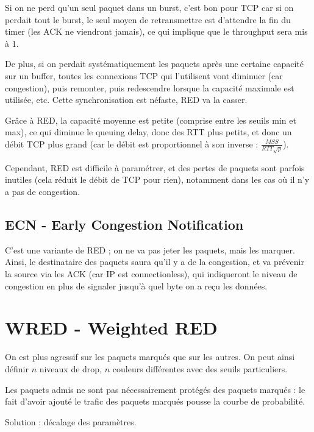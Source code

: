 			Si on ne perd qu'un seul paquet dans un burst, c'est bon pour TCP car si on perdait tout le burst, le seul moyen de retransmettre est d'attendre la fin du timer (les ACK ne viendront jamais), ce qui implique que le throughput sera mis à 1.
			
			De plus, si on perdait systématiquement les paquets après une certaine capacité sur un buffer, toutes les connexions TCP qui l'utilisent vont diminuer (car congestion), puis remonter, puis redescendre lorsque la capacité maximale est utilisée, etc. Cette synchronisation est néfaste, RED va la casser.
			
			Grâce à RED, la capacité moyenne est petite (comprise entre les seuils min et max), ce qui diminue le queuing delay, donc des RTT plus petits, et donc un débit TCP plus grand (car le débit est proportionnel à son inverse : $\frac{MSS}{RTT \sqrt{p}}$).
			
			Cependant, RED est difficile à paramétrer, et des pertes de paquets sont parfois inutiles (cela réduit le débit de TCP pour rien), notamment dans les cas où il n'y a pas de congestion.
			
			
			\subsection{ECN - Early Congestion Notification}
			
			C'est une variante de RED ; on ne va pas jeter les paquets, mais les marquer. Ainsi, le destinataire des paquets saura qu'il y a de la congestion, et va prévenir la source via les ACK (car IP est connectionless), qui indiqueront le niveau de congestion en plus de signaler jusqu'à quel byte on a reçu les données.
			
			\section{WRED - Weighted RED}
			
			On est plus agressif sur les paquets marqués que sur les autres. On peut ainsi définir $n$ niveaux de drop, $n$ couleurs différentes avec des seuils particuliers.
			
			
			Les paquets admis ne sont pas nécessairement protégés des paquets marqués : le fait d'avoir ajouté le trafic des paquets marqués pousse la courbe de probabilité.
			
			Solution : décalage des paramètres.
			
			
